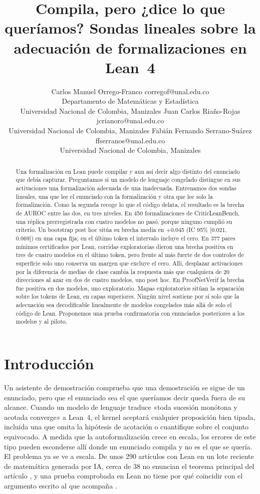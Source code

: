 \documentclass[10pt]{article}
\title{Compila, pero ¿dice lo que queríamos? Sondas lineales sobre la adecuación de formalizaciones en Lean~4}
\author{\name Carlos Manuel Orrego-Franco \email corregof@unal.edu.co \\
      \addr Departamento de Matem\'aticas y Estad\'istica\\
      Universidad Nacional de Colombia, Manizales
      \AND
      \name Juan Carlos Ria\~no-Rojas \email jcrianoro@unal.edu.co \\
      \addr Universidad Nacional de Colombia, Manizales
      \AND
      \name Fabi\'an Fernando Serrano-Su\'arez \email ffserranos@unal.edu.co \\
      \addr Universidad Nacional de Colombia, Manizales}
\newcommand{\ic}[2]{[#1,\,#2]}
\begin{document}
\maketitle

\begin{abstract}
Una formalización en Lean puede compilar y aun así decir algo distinto del enunciado que debía capturar. Preguntamos
si un modelo de lenguaje congelado distingue en sus activaciones una formalización adecuada de una inadecuada.
Entrenamos dos sondas lineales, una que lee el enunciado con la formalización y otra que lee solo la formalización.
Como la segunda recoge lo que el código delata, el resultado es la brecha de AUROC entre las dos, en tres niveles. En
450 formalizaciones de CriticLeanBench, una réplica prerregistrada con cuatro modelos no pasó, porque ninguno cumplió
su criterio. Un bootstrap post hoc sitúa su brecha media en +0.045 (IC 95\% \ic{0.021}{0.069}) en una capa fija; en el
último token el intervalo incluye el cero. En 377 pares mínimos certificados por Lean, corridas exploratorias dieron
una brecha positiva en tres de cuatro modelos en el último token, pero frente al más fuerte de dos controles de
superficie solo uno conserva un margen que excluye el cero. Allí, desplazar activaciones por la diferencia de medias
de clase cambia la respuesta más que cualquiera de 20 direcciones al azar en dos de cuatro modelos, uno post hoc. En
ProofNetVerif la brecha fue positiva en dos modelos, uno exploratorio. Mapas exploratorios sitúan la separación sobre
los tokens de Lean, en capas superiores. Ningún nivel sostiene por sí solo que la adecuación sea decodificable
linealmente de modelos congelados más allá de solo el código de Lean. Proponemos una prueba confirmatoria con
enunciados posteriores a los modelos y al piloto.
\end{abstract}

\section{Introducción}

Un asistente de demostración comprueba que una demostración se sigue de un enunciado, pero que el enunciado sea el
que queríamos decir queda fuera de su alcance. Cuando un modelo de lenguaje traduce «toda sucesión monótona y acotada
converge» a Lean~4, el kernel aceptará cualquier proposición bien tipada, incluida una que omita la hipótesis de
acotación o cuantifique sobre el conjunto equivocado. A medida que la autoformalización crece en escala, los errores
de este tipo pueden esconderse allí donde un enunciado compila y no es el que se quería.
El problema ya se ve a escala. De unos 290 artículos con Lean en un lote reciente de matemática generada por IA, cerca
de 38 no enuncian el teorema principal del artículo \citep{xena2026checked}, y una prueba comprobada en Lean no tiene
por qué coincidir con el argumento escrito al que acompaña \citep{bastounis2026lost}.
\end{document}
